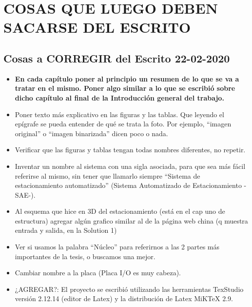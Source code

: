 \chapter{COSAS QUE LUEGO DEBEN SACARSE DEL ESCRITO}  \label{cap:varios}



\section{Cosas a CORREGIR del Escrito 22-02-2020}

\begin{itemize}
	\item \textbf{En cada capítulo poner al principio un resumen de lo que se va a tratar en el mismo. Poner algo similar a lo que se escribió sobre dicho capítulo al final de la Introducción general del trabajo.}
	\item Poner texto más explicativo en las figuras y las tablas. Que leyendo el epígrafe se pueda entender de qué se trata la foto. Por ejemplo, “imagen original” o “imagen binarizada” dicen poco o nada.
	\item Verificar que las figuras y tablas tengan todas nombres diferentes, no repetir.
	\item Inventar un nombre al sistema con una sigla asociada, para que sea más fácil referirse al mismo, sin tener que llamarlo siempre “Sistema de estacionamiento automatizado” (Sistema Automatizado de Estacionamiento -SAE-).
	\item Al esquema que hice en 3D del estacionamiento (está en el cap uno de estructura) agregar algún grafico similar al de la página web china (q muestra entrada y salida, en la Solution 1)
	\item Ver si usamos la palabra “Núcleo” para referirnos a las 2 partes más importantes de la tesis, o buscamos una mejor.
	\item Cambiar nombre a la placa (Placa I/O es muy cabeza).
	\item ¿AGREGAR?: El proyecto se escribió utilizando las herramientas TexStudio versión 2.12.14 (editor de Latex) y la 
	distribución de Latex MiKTeX 2.9.
\end{itemize}





